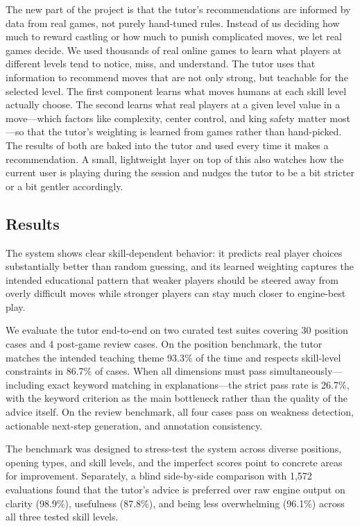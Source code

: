 \documentclass[11pt]{article}
\begin{document}
The new part of the project is that the tutor's recommendations are informed by data from real games, not purely hand-tuned rules. Instead of us deciding how much to reward castling or how much to punish complicated moves, we let real games decide. We used thousands of real online games to learn what players at different levels tend to notice, miss, and understand. The tutor uses that information to recommend moves that are not only strong, but teachable for the selected level.
The first component learns what moves humans at each skill level actually choose. The second learns what real players at a given level value in a move---which factors like complexity, center control, and king safety matter most---so that the tutor's weighting is learned from games rather than hand-picked. The results of both are baked into the tutor and used every time it makes a recommendation. A small, lightweight layer on top of this also watches how the current user is playing during the session and nudges the tutor to be a bit stricter or a bit gentler accordingly.

\subsection*{Results}
The system shows clear skill-dependent behavior: it predicts real player choices substantially better than random guessing, and its learned weighting captures the intended educational pattern that weaker players should be steered away from overly difficult moves while stronger players can stay much closer to engine-best play.

We evaluate the tutor end-to-end on two curated test suites covering 30 position cases and 4 post-game review cases. On the position benchmark, the tutor matches the intended teaching theme 93.3\% of the time and respects skill-level constraints in 86.7\% of cases. When all dimensions must pass simultaneously---including exact keyword matching in explanations---the strict pass rate is 26.7\%, with the keyword criterion as the main bottleneck rather than the quality of the advice itself. On the review benchmark, all four cases pass on weakness detection, actionable next-step generation, and annotation consistency.

The benchmark was designed to stress-test the system across diverse positions, opening types, and skill levels, and the imperfect scores point to concrete areas for improvement. Separately, a blind side-by-side comparison with 1{,}572 evaluations found that the tutor's advice is preferred over raw engine output on clarity (98.9\%), usefulness (87.8\%), and being less overwhelming (96.1\%) across all three tested skill levels.
\end{document}
